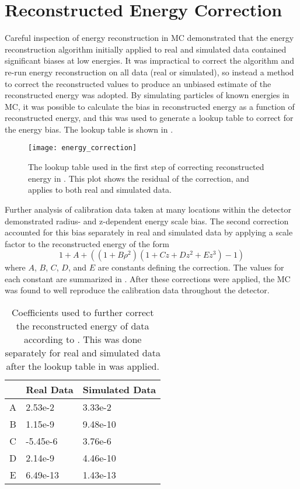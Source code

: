 \clearpage 

\section{Reconstructed Energy Correction}

Careful inspection of energy reconstruction in MC demonstrated that the energy reconstruction algorithm initially applied to real and simulated data contained significant biases at low energies.
It was impractical to correct the algorithm and re-run energy reconstruction on all data (real or simulated), so instead a method to correct the reconstructed values to produce an unbiased estimate of the reconstructed energy was adopted.
By simulating particles of known energies in MC, it was possible to calculate the bias in reconstructed energy as a function of reconstructed energy, and this was used to generate a lookup table to correct for the energy bias.
The lookup table is shown in .

\begin{figure}
\centering
\texttt{[image: energy\_correction]}
\caption{\label{fig:energy_lookup}The lookup table used in the first step of correcting reconstructed energy in {\snop}. This plot shows the residual of the correction, and applies to both real and simulated data.}
\end{figure}

Further analysis of \N calibration data taken at many locations within the detector demonstrated radius- and z-dependent energy scale bias.
The second correction accounted for this bias separately in real and simulated data by applying a scale factor to the reconstructed energy of the form
\begin{equation}
1 + A + ( (1 + B \rho^2)(1 + Cz + Dz^2 + Ez^3) - 1 )
\end{equation}
where $A$, $B$, $C$, $D$, and $E$ are constants defining the correction.
The values for each constant are summarized in .
After these corrections were applied, the MC was found to well reproduce the \N calibration data throughout the detector.

\begin{table}
\centering
\begin{tabular}{c|l|l}
& Real Data & Simulated Data \\ \hline
A & 2.53e-2 & 3.33e-2 \\ \hline
B & 1.15e-9 & 9.48e-10\\ \hline
C & -5.45e-6 & 3.76e-6\\ \hline
D & 2.14e-9 & 4.46e-10 \\ \hline
E & 6.49e-13 & 1.43e-13
\end{tabular}
\caption{\label{tbl:energy_correction}Coefficients used to further correct the reconstructed energy of {\snop} data according to . This was done separately for real and simulated data after the lookup table in  was applied.}
\end{table}

